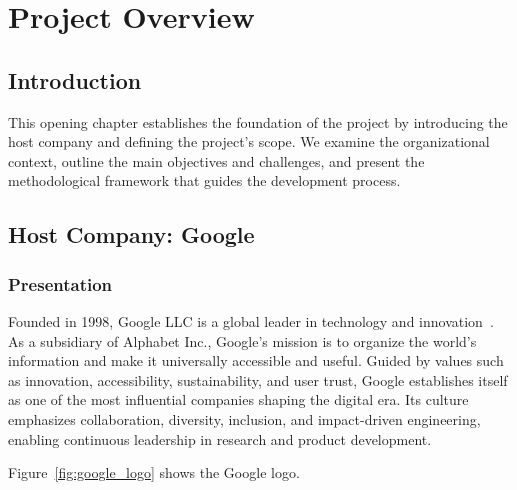 \setcounter{mtc}{5} %
\chapter{Project Overview}
\minitoc  %

\graphicspath{{Chapitre1/figures/}}
\pagestyle{fancy}
\fancyhf{}
\fancyfoot[R]{\thepage}
\renewcommand{\headrulewidth}{0.5pt}
\renewcommand{\footrulewidth}{0pt}

\begin{spacing}{1.2}

\section*{Introduction}
This opening chapter establishes the foundation of the project by introducing the
host company and defining the project’s scope. We examine the organizational context,
outline the main objectives and challenges, and present the methodological framework that
guides the development process.


\section{Host Company: Google} 

\subsection{Presentation} 
Founded in 1998, Google LLC is a global leader in technology and innovation~\cite{google2024company}. As a subsidiary of Alphabet Inc., Google's mission is to organize the world's information and make it universally accessible and useful. Guided by values such as innovation, accessibility, sustainability, and user trust, Google establishes itself as one of the most influential companies shaping the digital era. Its culture emphasizes collaboration, diversity, inclusion, and impact-driven engineering, enabling continuous leadership in research and product development.

Figure~\ref{fig:google_logo} shows the Google logo.


\end{spacing}
